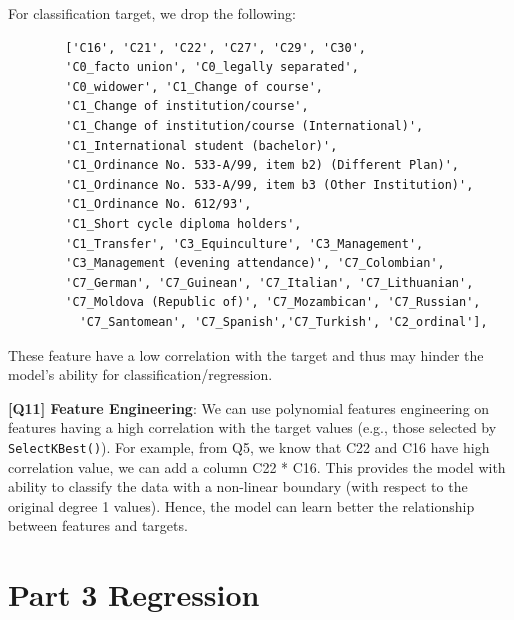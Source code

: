 \documentclass{article}
\begin{document}
\begin{description}
	For classification target, we drop the following:

	\begin{verbatim}
		['C16', 'C21', 'C22', 'C27', 'C29', 'C30', 
		'C0_facto union', 'C0_legally separated', 
		'C0_widower', 'C1_Change of course',
		'C1_Change of institution/course',
		'C1_Change of institution/course (International)',
		'C1_International student (bachelor)',
		'C1_Ordinance No. 533-A/99, item b2) (Different Plan)',
		'C1_Ordinance No. 533-A/99, item b3 (Other Institution)',
		'C1_Ordinance No. 612/93', 
		'C1_Short cycle diploma holders',
		'C1_Transfer', 'C3_Equinculture', 'C3_Management',
		'C3_Management (evening attendance)', 'C7_Colombian', 
		'C7_German', 'C7_Guinean', 'C7_Italian', 'C7_Lithuanian', 
		'C7_Moldova (Republic of)', 'C7_Mozambican', 'C7_Russian', 
		  'C7_Santomean', 'C7_Spanish','C7_Turkish', 'C2_ordinal'],
	\end{verbatim}

	  These feature have a low correlation with the target and thus may hinder the model's ability for classification/regression.

	\item \textbf{[Q11] Feature Engineering}:
		We can use polynomial features engineering on features having a high correlation with the target values (e.g., those selected by \texttt{SelectKBest()}). For example, from Q5, we know that C22 and C16 have high correlation value, we can add a column C22 * C16. This provides the model with ability to classify the data with a non-linear boundary (with respect to the original degree 1 values). Hence, the model can learn better the relationship between features and targets.

		\section*{Part 3 Regression}

\end{description}
\end{document}
